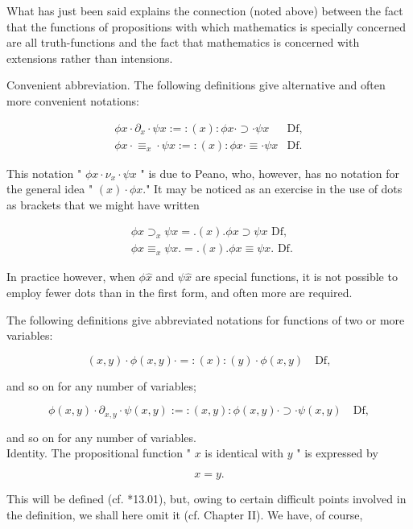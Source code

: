 \documentclass[10pt]{article}
\begin{document}
What has just been said explains the connection (noted above) between the fact that the functions of propositions with which mathematics is specially concerned are all truth-functions and the fact that mathematics is concerned with extensions rather than intensions.

Convenient abbreviation. The following definitions give alternative and often more convenient notations:

$$
\begin{array}{ll}
\phi x \cdot \partial_{x} \cdot \psi x:=:(x): \phi x \cdot \supset \cdot \psi x & \mathrm{Df}, \\
\phi x \cdot \equiv_{x} \cdot \psi x:=:(x): \phi x \cdot \equiv \cdot \psi x & \mathrm{Df} .
\end{array}
$$

This notation " $\phi x \cdot \nu_{x} \cdot \psi x$ " is due to Peano, who, however, has no notation for the general idea " $(x) \cdot \phi x$." It may be noticed as an exercise in the use of dots as brackets that we might have written

$$
\begin{aligned}
& \phi x \supset_{x} \psi x=.(x) . \phi x \supset \psi x \text { Df, } \\
& \phi x \equiv_{x} \psi x .=.(x) . \phi x \equiv \psi x . \text { Df. }
\end{aligned}
$$

In practice however, when $\phi \hat{x}$ and $\psi \hat{x}$ are special functions, it is not possible to employ fewer dots than in the first form, and often more are required.

The following definitions give abbreviated notations for functions of two or more variables:

$$
(x, y) \cdot \phi(x, y) \cdot=:(x):(y) \cdot \phi(x, y) \quad \mathrm{Df},
$$

and so on for any number of variables;

$$
\phi(x, y) \cdot \partial_{x, y} \cdot \psi(x, y):=:(x, y): \phi(x, y) \cdot \supset \cdot \psi(x, y) \quad \mathrm{Df},
$$

and so on for any number of variables.\\
Identity. The propositional function " $x$ is identical with $y$ " is expressed by

$$
x=y .
$$

This will be defined (cf. *13.01), but, owing to certain difficult points involved in the definition, we shall here omit it (cf. Chapter II). We have, of course,
\end{document}
